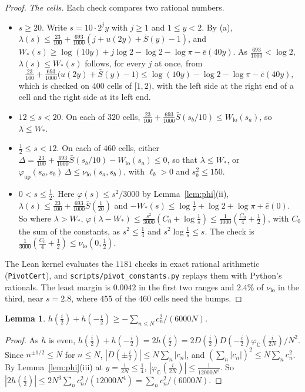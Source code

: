\documentclass[11pt]{article}
\newtheorem{lemma}[theorem]{Lemma}
\theoremstyle{definition}
\newcommand{\lean}[1]{\texttt{#1}}
\begin{document}
\begin{proof}
\emph{The cells.} Each check compares two rational numbers.
\begin{itemize}
\item $s \ge 20$. Write $s = 10 \cdot 2^j y$ with $j \ge 1$ and $1 \le y < 2$. By (a), $\lambda(s) \le \frac{23}{100} +
\frac{693}{1000}(j + u(2y) + \bar S(y) - 1)$, and $W_*(s) \ge \log(10y) + j\log 2 - \log 2 - \log \pi - \bar e(40y)$. As
$\frac{693}{1000} < \log 2$, $\lambda(s) \le W_*(s)$ follows, for every $j$ at once, from
\[
\tfrac{23}{100} + \tfrac{693}{1000}\big(u(2y) + \bar S(y) - 1\big) \le \log(10y) - \log 2 - \log \pi - \bar e(40y),
\]
which is checked on $400$ cells of $[1, 2)$, with the left side at the right end of a cell and the right side at its
left end.
\item $12 \le s < 20$. On each of $320$ cells, $\frac{23}{100} + \frac{693}{1000} \bar S(s_b/10) \le
W_{\mathrm{lo}}(s_a)$, so
$\lambda \le W_*$.
\item $\frac12 \le s < 12$. On each of $460$ cells, either $\Delta = \frac{23}{100} + \frac{693}{1000} \bar S(s_b/10) -
W_{\mathrm{lo}}(s_a) \le 0$, so that $\lambda \le W_*$, or $\varphi_{\mathrm{up}}(s_a, s_b)\,\Delta \le
\nu_{\mathrm{lo}}(s_a,
s_b)$, with $\ell_b > 0$ and $s_b^2 \le 150$.
\item $0 < s \le \frac12$. Here $\varphi(s) \le s^2/3000$ by Lemma~\ref{lem:phi}(ii), $\lambda(s) \le \frac{23}{100} +
\frac{693}{1000} \bar S(\frac{1}{20})$ and $-W_*(s) \le \log\frac1s
+ \log 2 + \log \pi + \bar e(0)$. So where $\lambda > W_*$,
$\varphi(\lambda - W_*) \le \frac{s^2}{3000}(C_0 + \log\frac1s) \le \frac{1}{3000}(\frac{C_0}{4} + \frac12)$, with $C_0$
the sum of the constants, as $s^2 \le \frac14$ and $s^2 \log\frac1s \le s$. The check is $\frac{1}{3000}(\frac{C_0}{4} +
\frac12) \le \nu_{\mathrm{lo}}(0, \frac12)$.
\end{itemize}
The Lean kernel evaluates the $1181$ checks in exact rational arithmetic (\lean{PivotCert}), and
\texttt{scripts/pivot\_constants.py} replays them with Python's rationals. The least margin is $0.0042$ in the first two
ranges and $2.4\%$ of $\nu_{\mathrm{lo}}$ in the third, near $s = 2.8$, where $455$ of the $460$ cells need the bumps.
\end{proof}

\begin{lemma}\label{lem:pole}
$h(\frac i2) + h(-\frac i2) \ge -\sum_{n \le N} c_n^2/(6000N)$.
\end{lemma}

\begin{proof}
As $h$ is even, $h(\frac i2) + h(-\frac i2) = 2h(\frac i2) = 2D(\frac i2) D(-\frac i2)\varphi_{\mathbb
C}(\frac{i}{2N})/N^2$. Since $n^{\pm 1/2} \le N$ for $n \le N$, $|D(\pm\frac i2)| \le N \sum_n |c_n|$, and $(\sum_n
|c_n|)^2 \le N \sum_n c_n^2$. By Lemma~\ref{lem:phi}(iii) at $y = \frac{1}{2N} \le \frac14$, $|\varphi_{\mathbb
C}(\frac{i}{2N})| \le \frac{1}{12000N^2}$. So $|2h(\frac i2)| \le 2N^3 \sum_n c_n^2/(12000N^4) = \sum_n
c_n^2/(6000N)$.
\end{proof}
\end{document}
